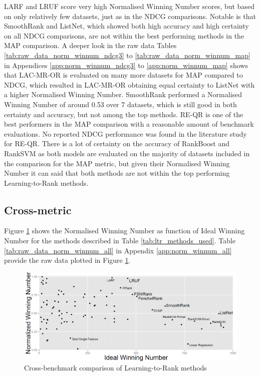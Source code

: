 \documentclass{sig-alternate-2013}
\begin{document}
LARF and LRUF score very high Normalised Winning Number scores, but based on only relatively few datasets, just as in the NDCG comparisons. Notable is that SmoothRank and ListNet, which showed both high accuracy and high certainty on all NDCG comparisons, are not within the best performing methods in the MAP comparison. A deeper look in the raw data Tables \ref{tab:raw_data_norm_winnum_ndcg3} to \ref{tab:raw_data_norm_winnum_map} in Appendices \ref{app:norm_winnum_ndcg3} to \ref{app:norm_winnum_map} shows that LAC-MR-OR is evaluated on many more datasets for MAP compared to NDCG, which resulted in LAC-MR-OR obtaining equal certainty to ListNet with a higher Normalised Winning Number. SmoothRank performed a Normalised Winning Number of around 0.53 over 7 datasets, which is still good in both certainty and accuracy, but not among the top methods. RE-QR is one of the best performers in the MAP comparison with a reasonable amount of benchmark evaluations. No reported NDCG performance was found in the literature study for RE-QR. There is a lot of certainty on the accuracy of RankBoost and RankSVM as both models are evaluated on the majority of datasets included in the comparison for the MAP metric, but given their Normalised Winning Number it can said that both methods are not within the top performing Learning-to-Rank methods.

\subsection{Cross-metric}
Figure \ref{fig:normalised_winning_number_all} shows the Normalised Winning Number as function of Ideal Winning Number for the methods described in Table \ref{tab:ltr_methods_used}. Table \ref{tab:raw_data_norm_winnum_all} in Appendix \ref{app:norm_winnum_all} provide the raw data plotted in Figure \ref{fig:normalised_winning_number_all}.\\

\begin{figure}[!h]
\includegraphics[scale=0.33]{gfx/combined_normalized_winnum}
\caption{Cross-benchmark comparison of Learning-to-Rank methods}
\label{fig:normalised_winning_number_all}
\end{figure}
\end{document}

